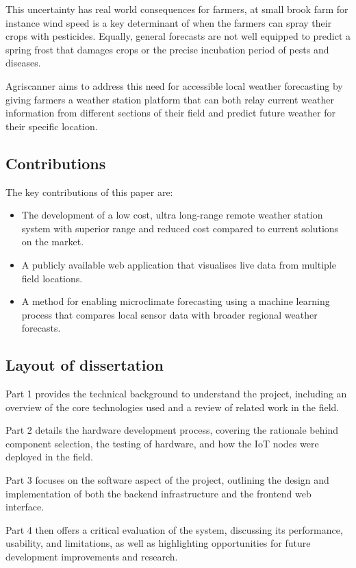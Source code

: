 This uncertainty has real world consequences for farmers, at small brook farm
for instance wind speed is a key determinant of when the farmers can spray their
crops with pesticides. Equally, general forecasts are not well equipped to
predict a spring frost that damages crops or the precise incubation period of
pests and diseases.

Agriscanner aims to address this need for accessible local weather forecasting
by giving farmers a weather station platform that can both relay current weather
information from different sections of their field and predict future weather
for their specific location.

\subsection{Contributions}

The key contributions of this paper are:

\begin{itemize}
    \item The development of a low cost, ultra long-range remote weather station
    system with superior range and reduced cost compared to current solutions on
    the market.
    \item A publicly available web application that visualises live data from
    multiple field locations.
    \item A method for enabling microclimate forecasting using a machine
    learning process that compares local sensor data with broader regional
    weather forecasts.
\end{itemize}

\subsection{Layout of dissertation}

Part 1 provides the technical background to understand the project, including an
overview of the core technologies used and a review of related work in the
field.

Part 2 details the hardware development process, covering the rationale behind
component selection, the testing of hardware, and how the IoT nodes were
deployed in the field.

Part 3 focuses on the software aspect of the project, outlining the design and
implementation of both the backend infrastructure and the frontend web
interface.

Part 4 then offers a critical evaluation of the system, discussing its
performance, usability, and limitations, as well as highlighting opportunities
for future development improvements and research. 


  


